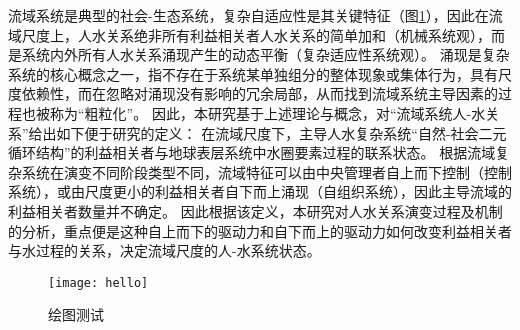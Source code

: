 流域系统是典型的社会-生态系统，复杂自适应性是其关键特征（图\ref{ch2:fig:complexity}），因此在流域尺度上，人水关系绝非所有利益相关者人水关系的简单加和（机械系统观），而是系统内外所有人水关系涌现产生的动态平衡（复杂适应性系统观）。
涌现是复杂系统的核心概念之一，指不存在于系统某单独组分的整体现象或集体行为，具有尺度依赖性，而在忽略对涌现没有影响的冗余局部，从而找到流域系统主导因素的过程也被称为“粗粒化”\cite{mitchell2011}。
因此，本研究基于上述理论与概念，对“流域系统人-水关系”给出如下便于研究的定义：
在流域尺度下，主导人水复杂系统“自然-社会二元循环结构”的利益相关者与地球表层系统中水圈要素过程的联系状态。
根据流域复杂系统在演变不同阶段类型不同，流域特征可以由中央管理者自上而下控制（控制系统），或由尺度更小的利益相关者自下而上涌现（自组织系统），因此主导流域的利益相关者数量并不确定。
因此根据该定义，本研究对人水关系演变过程及机制的分析，重点便是这种自上而下的驱动力和自下而上的驱动力如何改变利益相关者与水过程的关系，决定流域尺度的人-水系统状态。

\begin{figure}[htb] %
    \texttt{[image: hello]}
    \caption[流域系统作为社会-生态系统的概念图式]{绘图测试}\label{ch2:fig:complexity}
\end{figure}
